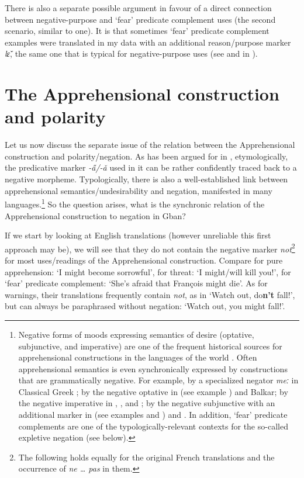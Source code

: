 \documentclass[output=paper,colorlinks,citecolor=brown
]{langscibook}
\begin{document}
There is also a separate possible argument in favour of a direct connection between negative-purpose and `fear' predicate complement uses (the second scenario, similar to  one). It is that sometimes `fear' predicate complement examples were translated in my data with an additional reason\slash purpose marker \textit{lɛ̌}, the same one that is typical for negative-purpose uses (see  and  in ).


\section{The Apprehensional construction and polarity}
\label{sec:fedotov:apprpolarity}

Let us now discuss the separate issue of the relation between the Apprehensional construction and polarity\slash negation. As has been argued for in , etymologically, the predicative marker \textit{-a̋/-ǎ} used in it can be rather confidently traced back to a negative morpheme. Typologically, there is also a well-established link between apprehensional semantics\slash undesirability and negation, manifested in many languages.\footnote{Negative forms of moods expressing semantics of desire (optative, subjunctive, and imperative) are one of the frequent historical sources for apprehensional constructions in the languages of the world \citep[49]{Dobrushina2006}. Often apprehensional semantics is even synchronically expressed by constructions that are grammatically negative. For example, by a specialized negator \textit{meː} in Classical Greek \citep[311--313]{lichtenberk1995}; by the negative optative in   (see example ) and Balkar; by the negative imperative in , , and ; by the negative subjunctive with an additional marker in  (see examples  and ) and  \citep[32--33, 36--39]{Dobrushina2006}. In addition, `fear' predicate complements are one of the typologically-relevant contexts for the so-called expletive negation \citep{jinkoenig2020} (see below).} So the question arises, what is the synchronic relation of the Apprehensional construction to negation in Gban?

If we start by looking at English translations (however unreliable this first approach may be), we will see that they do not contain the negative marker \textit{not}\footnote{The following holds equally for the original French translations and the occurrence of \textit{ne {\dots} pas} in them.} for most uses\slash readings of the Apprehensional construction. Compare for pure apprehension: `I might become sorrowful', for threat: `I might\slash will kill you!', for `fear' predicate complement: `She's afraid that François might die'. As for warnings, their translations frequently contain \textit{not}, as in `Watch out, do\textbf{n't} fall!', but can always be paraphrased without negation: `Watch out, you might fall!'.
\end{document}
